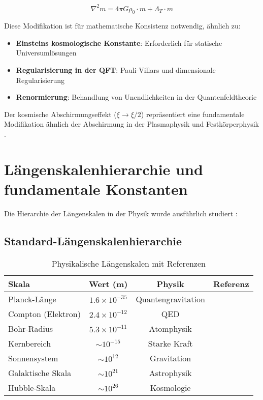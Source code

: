 \documentclass[12pt,a4paper]{article}
\begin{document}
	\begin{equation}
		\nabla^2 m = 4\pi G \rho_0 \cdot m + \Lambda_T \cdot m
	\end{equation}
	
	Diese Modifikation ist für mathematische Konsistenz notwendig, ähnlich zu:
	\begin{itemize}
		\item \textbf{Einsteins kosmologische Konstante}: Erforderlich für statische Universumlösungen \citep{einstein1917}
		\item \textbf{Regularisierung in der QFT}: Pauli-Villars und dimensionale Regularisierung \citep{peskin1995}
		\item \textbf{Renormierung}: Behandlung von Unendlichkeiten in der Quantenfeldtheorie \citep{collins1984}
	\end{itemize}
	
	Der kosmische Abschirmungseffekt ($\xi \to \xi/2$) repräsentiert eine fundamentale Modifikation ähnlich der Abschirmung in der Plasmaphysik \citep{chen1984} und Festkörperphysik \citep{ashcroft1976}.
	
	\section{Längenskalenhierarchie und fundamentale Konstanten}
	\label{sec:length_scales}
	
	Die Hierarchie der Längenskalen in der Physik wurde ausführlich studiert \citep{weinberg1995,wilczek2001,carr2007}:
	
	\subsection{Standard-Längenskalenhierarchie}
	\label{subsec:standard_hierarchy}
	
	\begin{table}[htbp]
		\centering
		\begin{tabular}{lccc}
			\toprule
			\textbf{Skala} & \textbf{Wert (m)} & \textbf{Physik} & \textbf{Referenz} \\
			\midrule
			Planck-Länge & $1.6 \times 10^{-35}$ & Quantengravitation & \citep{planck1900,weinberg1995} \\
			Compton (Elektron) & $2.4 \times 10^{-12}$ & QED & \citep{compton1923,peskin1995} \\
			Bohr-Radius & $5.3 \times 10^{-11}$ & Atomphysik & \citep{bohr1913,griffiths2004} \\
			Kernbereich & $\sim 10^{-15}$ & Starke Kraft & \citep{evans1955,perkins2000} \\
			Sonnensystem & $\sim 10^{12}$ & Gravitation & \citep{weinberg1972,will2014} \\
			Galaktische Skala & $\sim 10^{21}$ & Astrophysik & \citep{binney2008,carroll2006} \\
			Hubble-Skala & $\sim 10^{26}$ & Kosmologie & \citep{weinberg2008,peebles1993} \\
			\bottomrule
		\end{tabular}
		\caption{Physikalische Längenskalen mit Referenzen}
		\label{tab:length_scales}
	\end{table}
	
\end{document}
